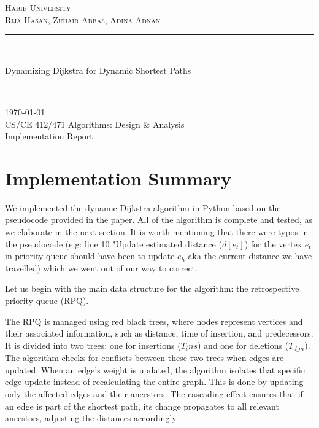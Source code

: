 \documentclass[12pt]{article}
\author{Your Name(s)}                     %
\date{\today}
\newcommand{\thetitle}{Dynamizing Dijkstra for Dynamic Shortest Paths}  %
\newcommand{\thedate}{\today}
\newcommand{\course}{CS/CE 412/471 Algorithms: Design \& Analysis}  %
\begin{document}
\begin{titlepage}
    \centering
    \vspace*{3.5cm}
    \textsc{\LARGE Habib University}\\[1.0cm]  %
    \textsc{\large Rija Hasan, Zuhair Abbas, Adina Adnan}\\[0.5cm]      %
    \rule{\linewidth}{0.2mm}\\[0.8cm]
    {
    \sffamily \huge \bfseries
    \linespread{1}\selectfont
    \begin{center}
        \parbox{0.9\textwidth}{\centering \thetitle}
    \end{center}
    \vspace*{0.4cm}
    }
    \rule{\linewidth}{0.2mm}\\[0.8cm]
    {\large \thedate}\\[1cm]
    \course\\                                  %
    Implementation Report
\end{titlepage}

\section*{Implementation Summary}

We implemented the dynamic Dijkstra algorithm in Python based on the pseudocode provided in the paper. All of the algorithm is complete and tested, as we elaborate in the next section. It is worth mentioning that there were typos in the pseudocode (e.g: line 10 "Update estimated distance ($d[e_t]$) for the vertex $e_t$ in priority queue should have been to update $e_h$ aka the current distance we have travelled) which we went out of our way to correct. 

Let us begin with the main data structure for the algorithm: the retrospective priority queue (RPQ).

The RPQ is managed using red black trees, where nodes represent vertices and their associated information, such as distance, time of insertion, and predecessors.
It is divided into two trees: one for insertions ($T_ins$) and one for deletions ($T_{d\_m}$). The algorithm checks for conflicts between these two trees when edges are updated. When an edge’s weight is updated, the algorithm isolates that specific edge update instead of recalculating the entire graph. This is done by updating only the affected edges and their ancestors.
The cascading effect ensures that if an edge is part of the shortest path, its change propagates to all relevant ancestors, adjusting the distances accordingly. 
\end{document}
